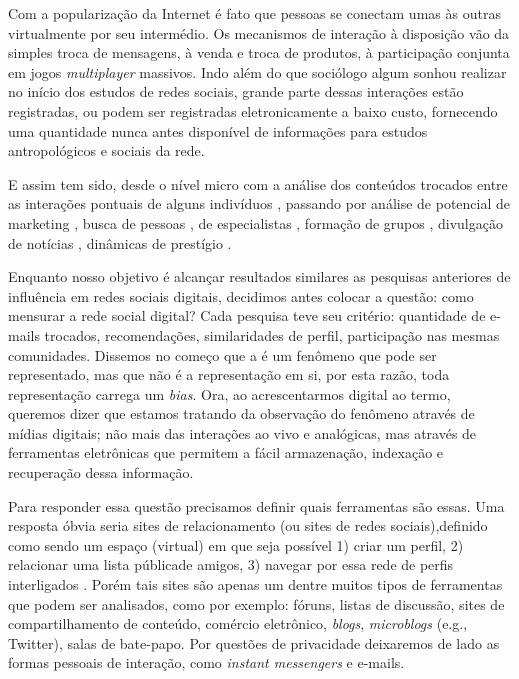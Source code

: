 \documentclass{article}
\begin{document}
Com a popularização da Internet é fato que pessoas se conectam umas às outras
virtualmente por seu intermédio. Os mecanismos de interação à disposição vão da
simples troca de mensagens, à venda e troca de produtos, à participação conjunta
em jogos \textit{multiplayer} massivos. Indo além do que sociólogo algum sonhou
realizar no início dos estudos de redes sociais, grande parte dessas interações
estão registradas, ou podem ser registradas eletronicamente a baixo custo,
fornecendo uma quantidade nunca antes disponível de informações para
estudos antropológicos e sociais da rede.

E assim tem sido, desde o nível micro com a análise dos conteúdos trocados
entre as interações pontuais de alguns indivíduos \cite{Recuero2008}, passando
por análise de potencial de marketing
\cite{Clemons2007}\cite{Domingos2001}\cite{Richardson2002}\cite{Ma2008}, busca
de pessoas \cite{ADAMIC2005}, de especialistas \cite{Ehrlich2007}, formação de
grupos \cite{Adamic2003}\cite{Backstrom2006}\cite{Kumar2006}, divulgação de
notícias \cite{Gruhl2004}, dinâmicas de prestígio
\cite{Salganik2006}\cite{Song2007}.

Enquanto nosso objetivo é alcançar resultados similares as pesquisas anteriores
de influência em redes sociais digitais, decidimos antes colocar a questão: como
mensurar a rede social digital? Cada pesquisa teve seu critério: quantidade de
e-mails trocados, recomendações, similaridades de perfil, participação nas mesmas
comunidades. Dissemos no começo que a \observednet é um fenômeno que pode ser
representado, mas que não é a representação em si, por esta razão, toda
representação carrega um \textit{bias}. Ora, ao acrescentarmos digital ao termo,
queremos dizer que estamos tratando da observação do fenômeno através de mídias
digitais; não mais das interações ao vivo e analógicas, mas através de
ferramentas eletrônicas que permitem a fácil armazenação, indexação e recuperação
dessa informação.

Para responder essa questão precisamos definir quais ferramentas são essas. Uma
resposta óbvia seria sites de relacionamento (ou sites de redes sociais),definido
como sendo um espaço (virtual) em que seja possível 1) criar um perfil, 2)
relacionar uma lista públicade amigos, 3) navegar por essa rede de perfis
interligados \cite{Boyd2007}. Porém tais sites são apenas um dentre muitos tipos
de ferramentas que podem ser analisados, como por exemplo: fóruns, listas de
discussão, sites de compartilhamento de conteúdo, comércio eletrônico,
\textit{blogs}, \textit{microblogs} (e.g., Twitter), salas de bate-papo. Por
questões de privacidade deixaremos de lado as formas pessoais de interação, como
\textit{instant messengers} e e-mails.
\end{document}
